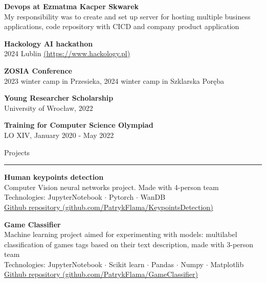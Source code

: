\documentclass{letter}
\begin{document}
\begin{minipage}[t]{0.70\textwidth}
\begin{tcolorbox}[colback=white, colframe=white, width=\textwidth, boxrule=0pt, sharp corners, height=\textheight, left=5mm, right=5mm, top=5mm, bottom=5mm]
{\vspace{1mm}
\textbf{Devops at Ezmatma Kacper Skwarek} \\
{\small 
My responsibility was to create and set up server for hosting multiple business applications, code repository with CICD and company product application
}

\vspace{1mm}
\textbf{Hackology AI hackathon} \\
{\small 2024 Lublin \href{https://www.hackology.pl/}{(https://www.hackology.pl)}}

\vspace{1mm}
\textbf{ZOSIA Conference} \\
{\small 2023 winter camp in Przesieka}, 
{\small 2024 winter camp in Szklarska Poręba}

\vspace{1mm}
\textbf{Young Researcher Scholarship} \\
{\small University of Wrocław, 2022}

\vspace{1mm}
\textbf{Training for Computer Science Olympiad} \\
{\small LO XIV, January 2020 - May 2022}

}


{\large Projects}
\rule{\linewidth}{0.4pt}

{ 

\textbf{Human keypoints detection}  \\
Computer Vision neural networks project. Made with 4-person team \\
{\small Technologies: JupyterNotebook $\cdot$ Pytorch $\cdot$ WanDB } \\
{\small \href{https://github.com/PatrykFlama/KeypointsDetection}{Github repository (github.com/PatrykFlama/KeypointsDetection)}}

\textbf{Game Classifier}  \\
Machine learning project aimed for experimenting with models: multilabel classification of games tags based on their text description, made with 3-person team \\
{\small Technologies: JupyterNotebook $\cdot$ Scikit learn $\cdot$ Pandas $\cdot$ Numpy $\cdot$ Matplotlib } \\
{\small \href{https://github.com/PatrykFlama/GameClassifier}{Github repository (github.com/PatrykFlama/GameClassifier)}}

}
\end{tcolorbox}
\end{minipage}
\end{document}
